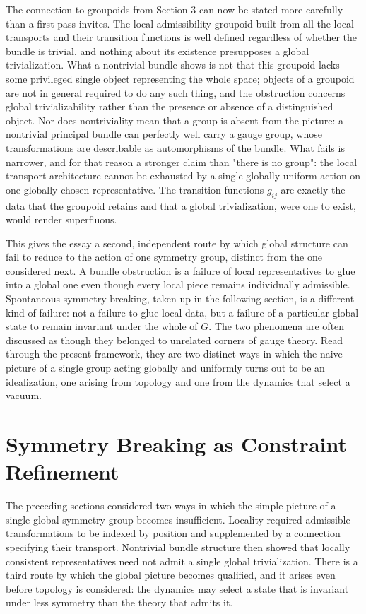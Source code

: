 \documentclass[11pt]{article}
\begin{document}
The connection to groupoids from Section 3 can now be stated more carefully than a first pass invites. The local admissibility groupoid built from all the local transports and their transition functions is well defined regardless of whether the bundle is trivial, and nothing about its existence presupposes a global trivialization. What a nontrivial bundle shows is not that this groupoid lacks some privileged single object representing the whole space; objects of a groupoid are not in general required to do any such thing, and the obstruction concerns global trivializability rather than the presence or absence of a distinguished object. Nor does nontriviality mean that a group is absent from the picture: a nontrivial principal bundle can perfectly well carry a gauge group, whose transformations are describable as automorphisms of the bundle. What fails is narrower, and for that reason a stronger claim than "there is no group": the local transport architecture cannot be exhausted by a single globally uniform action on one globally chosen representative. The transition functions $g_{ij}$ are exactly the data that the groupoid retains and that a global trivialization, were one to exist, would render superfluous.

This gives the essay a second, independent route by which global structure can fail to reduce to the action of one symmetry group, distinct from the one considered next. A bundle obstruction is a failure of local representatives to glue into a global one even though every local piece remains individually admissible. Spontaneous symmetry breaking, taken up in the following section, is a different kind of failure: not a failure to glue local data, but a failure of a particular global state to remain invariant under the whole of $G$. The two phenomena are often discussed as though they belonged to unrelated corners of gauge theory. Read through the present framework, they are two distinct ways in which the naive picture of a single group acting globally and uniformly turns out to be an idealization, one arising from topology and one from the dynamics that select a vacuum.

\section{Symmetry Breaking as Constraint Refinement}

The preceding sections considered two ways in which the simple picture of a single global symmetry group becomes insufficient. Locality required admissible transformations to be indexed by position and supplemented by a connection specifying their transport. Nontrivial bundle structure then showed that locally consistent representatives need not admit a single global trivialization. There is a third route by which the global picture becomes qualified, and it arises even before topology is considered: the dynamics may select a state that is invariant under less symmetry than the theory that admits it.
\end{document}
